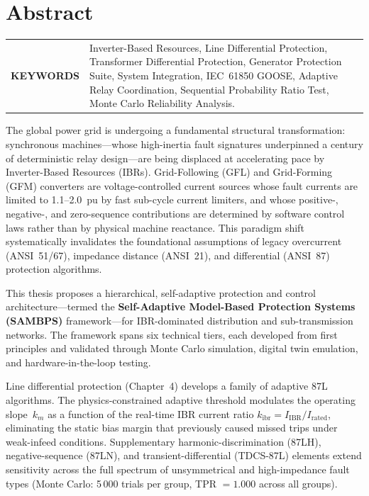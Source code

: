 \chapter{Abstract}

\begin{tabular}{@{} >{\bfseries}p{} p{} @{}}
\MakeUppercase{Keywords} &
Inverter-Based Resources, Line Differential Protection,
Transformer Differential Protection, Generator Protection Suite,
System Integration, IEC~61850 GOOSE, Adaptive Relay Coordination,
Sequential Probability Ratio Test, Monte Carlo Reliability Analysis.
\end{tabular}
\par

\begin{doublespacing}

The global power grid is undergoing a fundamental structural transformation:
synchronous machines---whose high-inertia fault signatures underpinned a
century of deterministic relay design---are being displaced at accelerating
pace by Inverter-Based Resources (IBRs). Grid-Following (GFL) and
Grid-Forming (GFM) converters are voltage-controlled current sources whose
fault currents are limited to 1.1--2.0~pu by fast sub-cycle current
limiters, and whose positive-, negative-, and zero-sequence contributions
are determined by software control laws rather than by physical machine
reactance. This paradigm shift systematically invalidates the foundational
assumptions of legacy overcurrent (ANSI~51/67), impedance distance (ANSI~21),
and differential (ANSI~87) protection algorithms.

This thesis proposes a hierarchical, self-adaptive protection and control
architecture---termed the \textbf{Self-Adaptive Model-Based Protection Systems (SAMBPS)}
framework---for IBR-dominated distribution and sub-transmission networks.
The framework spans six technical tiers, each developed from first principles
and validated through Monte Carlo simulation, digital twin emulation, and
hardware-in-the-loop testing.

Line differential protection (Chapter~4) develops a family of adaptive 87L
algorithms. The physics-constrained adaptive threshold modulates the operating
slope~$k_m$ as a function of the real-time IBR current ratio
$k_\mathrm{ibr} = I_\mathrm{IBR}/I_\mathrm{rated}$, eliminating the static
bias margin that previously caused missed trips under weak-infeed conditions.
Supplementary harmonic-discrimination (87LH), negative-sequence (87LN), and
transient-differential (TDCS-87L) elements extend sensitivity across the full
spectrum of unsymmetrical and high-impedance fault types (Monte Carlo: 5\,000
trials per group, TPR $= 1.000$ across all groups).


\end{doublespacing}

